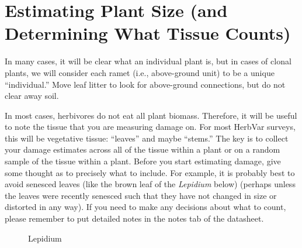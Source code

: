 \documentclass[
  letterpaper,
  DIV=11,
  numbers=noendperiod]{scrreprt}
\begin{document}
\section{Estimating Plant Size (and Determining What Tissue
Counts)}\label{estimating-plant-size-and-determining-what-tissue-counts}

In many cases, it will be clear what an individual plant is, but in
cases of clonal plants, we will consider each ramet (i.e., above-ground
unit) to be a unique ``individual.'' Move leaf litter to look for
above-ground connections, but do not clear away soil.

In most cases, herbivores do not eat all plant biomass. Therefore, it
will be useful to note the tissue that you are measuring damage on. For
most HerbVar surveys, this will be vegetative tissue: ``leaves'' and
maybe ``stems.'' The key is to collect your damage estimates across all
of the tissue within a plant or on a random sample of the tissue within
a plant. Before you start estimating damage, give some thought as to
precisely what to include. For example, it is probably best to avoid
senesced leaves (like the brown leaf of the \emph{Lepidium} below)
(perhaps unless the leaves were recently senesced such that they have
not changed in size or distorted in any way). If you need to make any
decisions about what to count, please remember to put detailed notes in
the notes tab of the datasheet.

\begin{figure}


\caption{\label{fig-lepidium}Lepidium}

\end{figure}%
\end{document}
